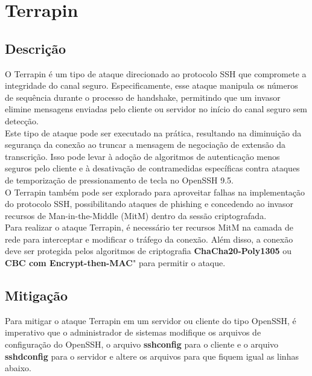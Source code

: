 \documentclass[12pt]{article}
\begin{document}
\section{Terrapin}

\subsection{Descrição}

O Terrapin é um tipo de ataque direcionado ao protocolo SSH que compromete a integridade do canal seguro. Especificamente, esse ataque manipula os números de sequência durante o processo de handshake, permitindo que um invasor elimine mensagens enviadas pelo cliente ou servidor no início do canal seguro sem detecção.\\

Este tipo de ataque pode ser executado na prática, resultando na diminuição da segurança da conexão ao truncar a mensagem de negociação de extensão da transcrição. Isso pode levar à adoção de algoritmos de autenticação menos seguros pelo cliente e à desativação de contramedidas específicas contra ataques de temporização de pressionamento de tecla no OpenSSH 9.5.\\

O Terrapin também pode ser explorado para aproveitar falhas na implementação do protocolo SSH, possibilitando ataques de phishing e concedendo ao invasor recursos de Man-in-the-Middle (MitM) dentro da sessão criptografada.\\

Para realizar o ataque Terrapin, é necessário ter recursos MitM na camada de rede para interceptar e modificar o tráfego da conexão. Além disso, a conexão deve ser protegida pelos algoritmos de criptografia \textbf{ChaCha20-Poly1305} ou \textbf{CBC com Encrypt-then-MAC}" para permitir o ataque.\\

\subsection{Mitigação}

Para mitigar o ataque Terrapin em um servidor ou cliente do tipo OpenSSH, é imperativo que o administrador de sistemas modifique os arquivos de configuração do OpenSSH, o arquivo \textbf{ssh\underline{\hspace{.1in}}config} para o cliente e o arquivo \textbf{sshd\underline{\hspace{.1in}}config} para o servidor e altere os arquivos para que fiquem igual as linhas abaixo.
\end{document}
